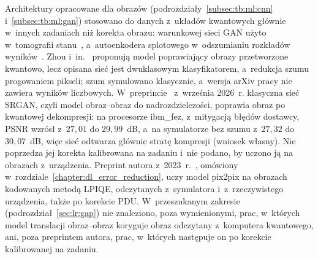 Architektury opracowane dla obrazów (podrozdziały~\ref{subsec:tb:ml:cnn} i~\ref{subsec:tb:ml:gan}) stosowano do danych z~układów kwantowych głównie w~innych zadaniach niż korekta obrazu: warunkowej sieci GAN użyto w~tomografii stanu~\cite{ahmed_quantum_2021}, a~autoenkodera splotowego w~odszumianiu rozkładów wyników~\cite{lin_quantum_2025}.
Zhou i~in.~\cite{zhou_quantum_2024} proponują model poprawiający obrazy przetworzone kwantowo, lecz opisana sieć jest dwuklasowym klasyfikatorem, a~redukcja szumu progowaniem pikseli; szum symulowano klasycznie, a~wersja arXiv pracy nie zawiera wyników liczbowych.
W~preprincie~\cite{jadhav_image_2026} z~września 2026~r. klasyczna sieć SRGAN, czyli model obraz--obraz do nadrozdzielczości, poprawia obraz po kwantowej dekompresji: na procesorze ibm\_fez, z~mitygacją błędów dostawcy, PSNR wzrósł z~$27{,}01$ do $29{,}99$~dB, a~na symulatorze bez szumu z~$27{,}32$ do $30{,}07$~dB, więc sieć odtwarza głównie stratę kompresji (wniosek własny).
Nie poprzedza jej korekta kalibrowana na zadaniu i~nie podano, by uczono ją na obrazach z~urządzenia.
Preprint autora z~2023~r.~\cite{werner_deep_learning_manuscript}, omówiony w~rozdziale~\ref{chapter:dl_error_reduction}, uczy model pix2pix na obrazach kodowanych metodą LPIQE, odczytanych z~symulatora i~z~rzeczywistego urządzenia, także po korekcie PDU.
W~przeszukanym zakresie (podrozdział~\ref{sec:lr:gap}) nie znaleziono, poza wymienionymi, prac, w~których model translacji obraz--obraz koryguje obraz odczytany z~komputera kwantowego, ani, poza preprintem autora, prac, w~których następuje on po korekcie kalibrowanej na zadaniu.

